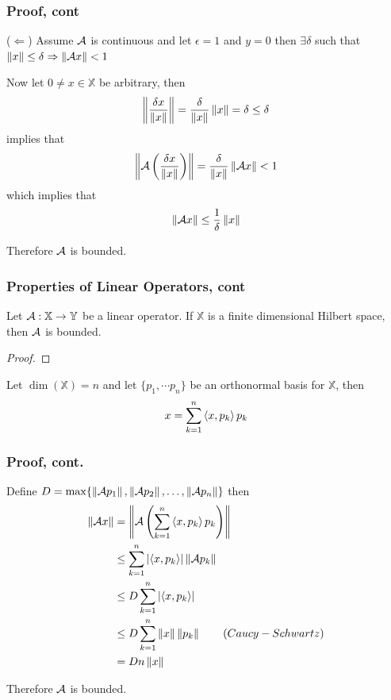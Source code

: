 \documentclass{beamer}
\begin{document}
\begin{frame}\frametitle{Proof, cont}
	\noindent ($\Leftarrow$) Assume $\mathcal{A}$ is continuous and let $\epsilon = 1$ and $y = 0$ then $\exists \delta$ such that $\left\| x \right\| \leq \delta \Rightarrow \left\| \mathcal{A} x \right\| < 1$
	
	\vfill 

	Now let $0 \neq x \in \mathbb{X}$ be arbitrary, then 
	\[ 
	\left\| \frac{\delta x}{\left\| x \right\|} \right\| = \frac{\delta}{\left\|x\right\|}\left\| x \right\| = \delta \leq \delta 
	\]
	implies that
	\[
		\left\|\mathcal{A}\left( \frac{\delta x}{\left\| x \right\|}\right)\right\| = \frac{\delta}{\left\| x \right\|}\left\| \mathcal{A} x \right\| < 1
	\]
	which implies that
	\[
	\left\| \mathcal{A} x \right\| \leq \frac{1}{\delta}\left\| x \right\|
	\]
	
	\vfill
	
	Therefore $\mathcal{A}$ is bounded.
\end{frame}

\begin{frame}\frametitle{Properties of Linear Operators, cont}
	\begin{theorem}
		Let $\mathcal{A}:\mathbb{X}\to\mathbb{Y}$ be a linear operator.  If $\mathbb{X}$ is a finite dimensional Hilbert space, then $\mathcal{A}$ is bounded.
	\end{theorem}
	
	\begin{proof}\end{proof}
		Let $\dim(\mathbb{X}) = n$ and let $\{p_1, \cdots p_n\}$ be an orthonormal basis for $\mathbb{X}$, then
		\[ 
		x = \sum_{k = 1}^n \left< x,p_k\right> p_k
		\]
\end{frame}

\begin{frame}\frametitle{Proof, cont.}

	Define $D = \max\{ \left\| \mathcal{A} p_1 \right\|, \left\|\mathcal{A} p_2 \right\|, \ldots, \left\|\mathcal{A} p_n\right\|\}$ then
	\begin{align*}
		\left\|\mathcal{A} x\right\| &= \left\|\mathcal{A}\left( \sum_{k=1}^n \left< x,p_k\right> p_k\right) \right\| \\
			&\leq \sum_{k=1}^n \left|\left< x,p_k\right>\right|\left\|\mathcal{A} p_k \right\| \\
			&\leq D\sum_{k=1}^n \left|\left< x,p_k\right> \right| \\
			&\leq D \sum_{k=1}^n \left\| x \right\|\left\| p_k \right\| \qquad{(Caucy-Schwartz)}\\
			&= D n \left\| x \right\|  \\
	\end{align*}
	
	Therefore $\mathcal{A}$ is bounded.	
\end{frame}
\end{document}
